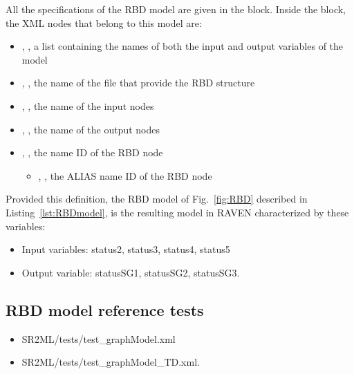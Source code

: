 All the specifications of the RBD model are given in the
 block.
Inside the  block, the XML
nodes that belong to this model are:
\begin{itemize}
  \item  {}, , a list containing the names of both the input and output variables of the model
  \item  {}, , the name of the file that provide the RBD structure
  \item  {}, , the name of the input nodes
  \item  {}, , the name of the output nodes
  \item  {}, , the name ID of the RBD node
	  \begin{itemize}
	    \item {}, , the ALIAS name ID of the RBD node
	  \end{itemize}
\end{itemize}

Provided this definition, the RBD model of Fig.~\ref{fig:RBD} described in Listing~\ref{lst:RBDmodel},
is the resulting model in RAVEN characterized by these variables:
\begin{itemize}
	\item Input variables: status2, status3, status4, status5
	\item Output variable: statusSG1, statusSG2, statusSG3.
\end{itemize}

\subsection{RBD model reference tests}
\begin{itemize}
	\item SR2ML/tests/test\_graphModel.xml
	\item SR2ML/tests/test\_graphModel\_TD.xml.
\end{itemize}
